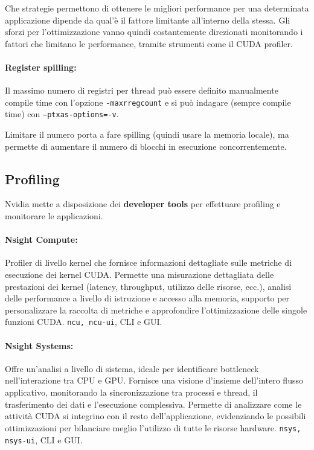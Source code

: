 Che strategie permettono di ottenere le migliori performance per una determinata applicazione dipende da qual'è il fattore limitante all'interno della stessa. Gli sforzi per l'ottimizzazione vanno quindi costantemente direzionati monitorando i fattori che limitano le performance, tramite strumenti come il CUDA profiler.

\paragraph{Register spilling:} Il massimo numero di registri per thread può essere definito manualmente compile time con l'opzione \texttt{-maxrregcount} e si può indagare (sempre compile time) con \texttt{--ptxas-options=-v}.

Limitare il numero porta a fare spilling (quindi usare la memoria locale), ma permette di aumentare il numero di blocchi in esecuzione concorrentemente.

\subsection{Profiling}

Nvidia mette a disposizione dei \textbf{developer tools} per effettuare profiling e monitorare le applicazioni.

\paragraph{Nsight Compute:} Profiler di livello kernel che fornisce informazioni dettagliate sulle metriche di esecuzione dei kernel CUDA. Permette una misurazione dettagliata delle prestazioni dei kernel (latency, throughput, utilizzo delle risorse, ecc.), analisi delle performance a livello di istruzione e accesso alla memoria, supporto per personalizzare la raccolta di metriche e approfondire l’ottimizzazione delle singole funzioni CUDA. \texttt{ncu, ncu-ui}, CLI e GUI.

\paragraph{Nsight Systems:} Offre un'analisi a livello di sistema, ideale per identificare bottleneck nell'interazione tra CPU e GPU. Fornisce una visione d'insieme dell'intero flusso applicativo, monitorando la sincronizzazione tra processi e thread, il trasferimento dei dati e l'esecuzione complessiva. Permette di analizzare come le attività CUDA si integrino con il resto dell'applicazione, evidenziando le possibili ottimizzazioni per bilanciare meglio l'utilizzo di tutte le risorse hardware. \texttt{nsys, nsys-ui}, CLI e GUI.

